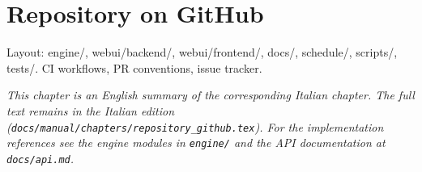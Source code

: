 \chapter{Repository on GitHub}
\label{ch:repository_github_en}

Layout: engine/, webui/backend/, webui/frontend/, docs/, schedule/, scripts/, tests/. CI workflows, PR conventions, issue tracker.

\medskip
\noindent
\textit{This chapter is an English summary of the corresponding Italian chapter. The full text remains in the Italian edition (\texttt{docs/manual/chapters/repository\_github.tex}). For the implementation references see the engine modules in \texttt{engine/} and the API documentation at \texttt{docs/api.md}.}
